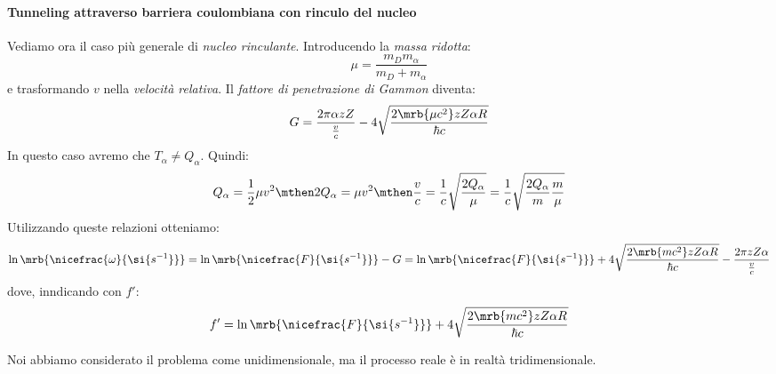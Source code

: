 \paragraph{Tunneling attraverso barriera coulombiana con rinculo del nucleo}
Vediamo ora il caso più generale di \textit{nucleo rinculante}. Introducendo la
\textit{massa ridotta}:
\[
  \mu = \frac{m_D m _{\alpha}}{m_D + m _{\alpha}}
\]
e trasformando $v$ nella \textit{velocità relativa}.
Il \textit{fattore di penetrazione di Gammon} diventa:
\[
  G = \frac{2 \pi \alpha zZ}{\frac{v}{c}} -4 \sqrt{\frac{2 \mrb{\mu c^2} zZ
  \alpha R}{\hbar c}}
\]
In questo caso avremo che $T _{\alpha} \neq Q _{\alpha}$. Quindi:
\[
  Q _{\alpha} = \frac{1}{2} \mu v^2
  \mthen
  2 Q _{\alpha} = \mu v^2
  \mthen
  \frac{v}{c} = \frac{1}{c} \sqrt{\frac{2 Q _{\alpha}}{\mu}}
  = \frac{1}{c} \sqrt{\frac{2 Q _{\alpha}}{m} \frac{m}{\mu}}
\]
Utilizzando queste relazioni otteniamo:
\[
  \ln \mrb{\nicefrac{\omega}{\si{s^{-1}}}} = \ln
  \mrb{\nicefrac{F}{\si{s^{-1}}}} - G = \ln
  \mrb{\nicefrac{F}{\si{s^{-1}}}} + 4\sqrt{\frac{2 \mrb{mc^2} zZ \alpha
  R}{\hbar c}} - \frac{2 \pi zZ \alpha}{\frac{v}{c}}
\]
dove, inndicando con $f'$:
\[
  f' = \ln \mrb{\nicefrac{F}{\si{s^{-1}}}} + 4\sqrt{\frac{2 \mrb{mc^2} zZ
  \alpha R}{\hbar c}}
\]

\begin{note}[]
  Noi abbiamo considerato il problema come unidimensionale, ma il processo
  reale è in realtà tridimensionale.
\end{note}

